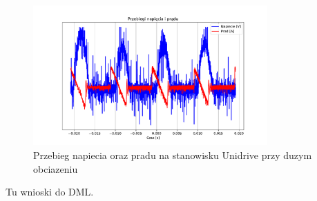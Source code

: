 \documentclass[11pt]{article}
\begin{document}
\begin{figure}[H]
\centering
\includegraphics[width=0.8\textwidth]{aun1_dml_obciazenie_hard.pdf}
\caption{Przebieg napiecia oraz pradu na stanowisku Unidrive przy duzym obciazeniu}
\end{figure}

Tu wnioski do DML.\\
\end{document}

